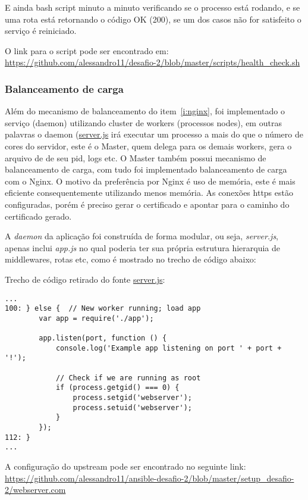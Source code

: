 E ainda bash script minuto a minuto verificando se o processo está rodando, e se
uma rota está retornando o código OK (200), se um dos casos não for
satisfeito o serviço é reiniciado.

O link para o script pode ser encontrado em:\\
\href{https://github.com/alessandro11/desafio-2/blob/master/scripts/health\_check.sh}{https://github.com/alessandro11/desafio-2/blob/master/scripts/health\_check.sh}


\subsubsection{Balanceamento de carga}
Além do mecanismo de balanceamento do item~\ref{i:nginx}, foi
implementado o serviço (daemon) utilizando cluster de workers
(processos nodes), em  outras palavras o daemon
(\href{https://github.com/alessandro11/desafio-2/blob/master/shipitfile.js}{server.js}
irá executar um processo a mais do que o número de cores do servidor,
este é o Master, quem delega para os demais workers, gera o arquivo de
de seu pid, logs etc. O Master também possui mecanismo de
balanceamento de carga, com tudo foi implementado balanceamento de
carga com o Nginx. O motivo da preferência por Nginx é uso de memória,
este é mais eficiente consequentemente utilizando menos memória. As
conexões https estão configuradas, porém é preciso 
gerar o certificado e apontar para o caminho do certificado
gerado.

A \emph{daemon} da aplicação foi construída de forma modular, ou seja,
\emph{server.js}, apenas inclui \emph{app.js} no qual poderia ter sua
própria estrutura hierarquia de middlewares, rotas etc, como é
mostrado no trecho de código abaixo:

Trecho de código retirado do fonte \href{https://github.com/alessandro11/desafio-2/blob/master/server.js}{server.js}:
\begin{verbatim}
...
100: } else {  // New worker running; load app
        var app = require('./app');

        app.listen(port, function () {
            console.log('Example app listening on port ' + port + '!');

            // Check if we are running as root
            if (process.getgid() === 0) {
                process.setgid('webserver');
                process.setuid('webserver');
            }
        });
112: }
...
\end{verbatim}

A configuração do upstream pode ser encontrado no seguinte link:\\
\href{https://github.com/alessandro11/ansible-desafio-2/blob/master/setup\_desafio-2/webserver.com}{https://github.com/alessandro11/ansible-desafio-2/blob/master/setup\_desafio-2/webserver.com}


